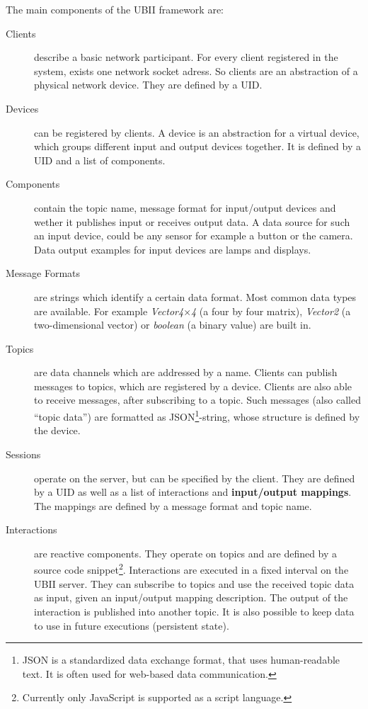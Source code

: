 The main components of the \ac{UBII} framework are:
\begin{description}
	\item[Clients] describe a basic network participant. For every client registered in the system, exists one network socket adress. So clients are an abstraction of a physical network device. They are defined by a \ac{UID}. 
	\item[Devices] can be registered by clients. A device is an abstraction for a virtual device, which groups different input and output devices together. It is defined by a \ac{UID} and a list of components.
  \item[Components] contain the topic name, message format for input/output devices and wether it publishes input or receives output data. A data source for such an input device, could be any sensor for example a button or the camera. Data output examples for input devices are lamps and displays.
  \item[Message Formats] are strings which identify a certain data format. Most common data types are available. For example \textit{Vector4\( \times \)4} (a four by four matrix), \textit{Vector2} (a two-dimensional vector) or \textit{boolean} (a binary value) are built in.
	\item[Topics] are data channels which are addressed by a name. Clients can publish messages to topics, which are registered by a device. Clients are also able to receive messages, after subscribing to a topic. Such messages (also called \enquote{topic data}) are formatted as JSON\footnote{JSON is a standardized data exchange format, that uses human-readable text. It is often used for web-based data communication.}-string, whose structure is defined by the device.
	\item[Sessions] operate on the server, but can be specified by the client. They are defined by a \ac{UID} as well as a list of interactions and \textbf{input/output mappings}. The mappings are defined by a message format and topic name.
	\item[Interactions] are reactive components. They operate on topics and are defined by a source code snippet\footnote{Currently only JavaScript is supported as a script language.}. Interactions are executed in a fixed interval on the \ac{UBII} server. They can subscribe to topics and use the received topic data as input, given an input/output mapping description. The output of the interaction is published into another topic. It is also possible to keep data to use in future executions (persistent state).
\end{description}

